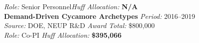 \documentclass[margin,line]{resume}
\begin{document}
\begin{resume}
    \textsl{Role:} Senior Personnel\hfill \textsl{Huff Allocation:} \textbf{N/A}\vspace{2mm}\\%
    \textbf{Demand-Driven Cycamore Archetypes} \hfill \textsl{Period:} 2016--2019\\
    \textsl{Source:} DOE, NEUP R\&D \hfill \textsl{Award Total:} \$800,000\\
    \textsl{Role:} Co-PI \hfill \textsl{Huff Allocation:} \textbf{\$395,066}\vspace{2mm}\\%

\end{resume}
\end{document}
